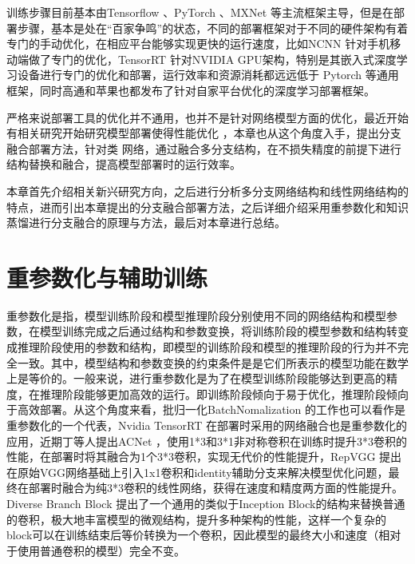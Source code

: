 训练步骤目前基本由Tensorflow \cite{tensorflow}、PyTorch \cite{pytorch}、MXNet \cite{mxnet} 等主流框架主导，但是在部署步骤，基本是处在“百家争鸣”的状态，不同的部署框架对于不同的硬件架构有着专门的手动优化，在相应平台能够实现更快的运行速度，比如NCNN \cite{ncnn} 针对手机移动端做了专门的优化，TensorRT \cite{tensorrt} 针对NVIDIA GPU架构，特别是其嵌入式深度学习设备进行专门的优化和部署，运行效率和资源消耗都远远低于 Pytorch 等通用框架，同时高通和苹果也都发布了针对自家平台优化的深度学习部署框架。

严格来说部署工具的优化并不通用，也并不是针对网络模型方面的优化，最近开始有相关研究开始研究模型部署使得性能优化 \cite{ding2019acnet, ding2021repvgg, ding2021diverse}，本章也从这个角度入手，提出分支融合部署方法，针对类 \cite{he2016deep} 网络，通过融合多分支结构，在不损失精度的前提下进行结构替换和融合，提高模型部署时的运行效率。

本章首先介绍相关新兴研究方向，之后进行分析多分支网络结构和线性网络结构的特点，进而引出本章提出的分支融合部署方法，之后详细介绍采用重参数化和知识蒸馏进行分支融合的原理与方法，最后对本章进行总结。

\section{重参数化与辅助训练}

重参数化是指，模型训练阶段和模型推理阶段分别使用不同的网络结构和模型参数，在模型训练完成之后通过结构和参数变换，将训练阶段的模型参数和结构转变成推理阶段使用的参数和结构，即模型的训练阶段和模型的推理阶段的行为并不完全一致。其中，模型结构和参数变换的约束条件是是它们所表示的模型功能在数学上是等价的。一般来说，进行重参数化是为了在模型训练阶段能够达到更高的精度，在推理阶段能够更加高效的运行。即训练阶段倾向于易于优化，推理阶段倾向于高效部署。从这个角度来看，批归一化BatchNomalization \cite{ioffe2015batch}的工作也可以看作是重参数化的一个代表，Nvidia TensorRT \cite{tensorrt} 在部署时采用的网络融合也是重参数化的应用，近期丁等人提出ACNet \cite{ding2019acnet}，使用1*3和3*1非对称卷积在训练时提升3*3卷积的性能，在部署时将其融合为1个3*3卷积，实现无代价的性能提升，RepVGG \cite{ding2021repvgg} 提出在原始VGG网络基础上引入1x1卷积和identity辅助分支来解决模型优化问题，最终在部署时融合为纯3*3卷积的线性网络，获得在速度和精度两方面的性能提升。Diverse Branch Block \cite{ding2021diverse} 提出了一个通用的类似于Inception Block的结构来替换普通的卷积，极大地丰富模型的微观结构，提升多种架构的性能，这样一个复杂的block可以在训练结束后等价转换为一个卷积，因此模型的最终大小和速度（相对于使用普通卷积的模型）完全不变。

